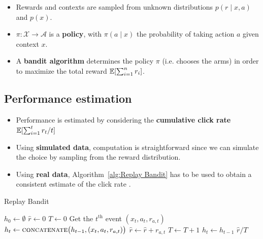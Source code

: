 \documentclass[a0,portrait]{a0poster}
\begin{document}
\begin{multicols}{2}
\vspace{0.1cm}
\begin{itemize}
    \item[] Rewards and contexts are sampled from unknown distributions $p(r \mid x, a)$ and $p(x)$.
    \item[] $\pi: \mathcal{X} \rightarrow \mathcal{A}$ is a \textbf{policy}, with $\pi(a \mid x)$ the probability of taking action $a$ given context $x$.
    
\item[] A \textbf{bandit algorithm} determines the policy $\pi$ (i.e. chooses the arms) in order to maximize the total reward $\operatorname{\mathbb{E}}[\sum_{i=1}^n r_i]$.
\end{itemize}

\subsection*{Performance estimation}
\begin{itemize}
    \item[] Performance is estimated by considering the \textbf{cumulative click rate} $\operatorname{\mathbb{E}}[\sum_{i=1}^t r_t / t]$
    \item[] Using \textbf{simulated data}, computation is straightforward since we can simulate the choice by sampling from the reward distribution.
    
    \item[] Using \textbf{real data}, Algorithm~\ref{alg:Replay Bandit} has to be used to obtain a consistent estimate of the click rate \cite{li2010}.
\end{itemize}


\begin{center}
\begin{minipage}{.33\textwidth}
\begin{algorithm}[H]
\caption{\label{alg:Replay Bandit}Replay Bandit}
\begin{algorithmic}[1]
    \State $ h_0 \leftarrow \emptyset $
    \State $ \widehat{r} \leftarrow 0$
    \State $ T \leftarrow 0$
        \State Get the $ t^\text{th}$ event $ (x_t, a_{t}, r_{a,t})$
            \State $ h_{t}\leftarrow \textsc{concatenate}\big( h_{t-1}, (x_{t}, a_{t}, r_{a,t}) \big)$
            \State $ \widehat{r} \leftarrow \widehat{r} + r_{a, t}$
            \State $ T \leftarrow T+1$
            \Else
            \State $h_{t} \leftarrow h_{t-1}$
        \EndIf
    \EndFor
    \State\Return $\widehat{r} / T$
\end{algorithmic}
\end{algorithm}
\end{minipage}
\par\bigskip
\end{center}



\end{multicols}
\end{document}
